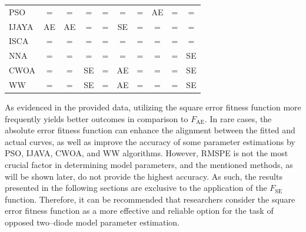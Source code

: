 \documentclass[a4paper,fleqn]{cas-dc}
\begin{document}
\begin{table}[<options>]
\begin{tabular*}{\tblwidth}{@{}LCCCCCCCCC@{}}
PSO &=  &=  &=  &=  &=  &=  & AE &=  &=  \\
IJAYA & AE & AE & = &=  &SE & = & = &=  &=  \\
ISCA &=  &=  &=  &=  &=  &=  &=  &=  &=  \\
NNA &=  &=  &=  &=  &=  &=  &=  &=  & SE\\
CWOA &=  &=  & SE&=  &  AE&=  &=  &=  &SE \\
WW &=  &=  & SE& = & AE & = &=  &=  & SE\\
\bottomrule
\end{tabular*}
\end{table}

As evidenced in the provided data, utilizing the square error fitness function more frequently yields better outcomes in comparison to $F_\mathrm{AE}$.
In rare cases, the absolute error fitness function can enhance the alignment between the fitted and actual curves,
as well as improve the accuracy of some parameter estimations by PSO, IJAVA, CWOA, and WW algorithms.
However, RMSPE is not the most crucial factor in determining model parameters, and the mentioned methods,
as will be shown later, do not provide the highest accuracy.
As such, the results presented in the following sections are exclusive to the application of the $F_\mathrm{SE}$ function.
Therefore, it can be recommended that researchers consider
the square error fitness function as a more effective and reliable option for the task of opposed two--diode model parameter estimation.
\end{document}
